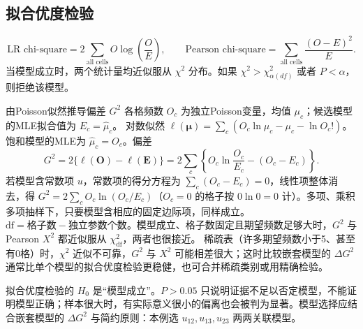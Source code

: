 \subsection{拟合优度检验}
\[
\text{LR chi-square}=2\sum_{\text{all cells}}O\log\left(\frac OE\right),\qquad
\text{Pearson chi-square}=\sum_{\text{all cells}}\frac{(O-E)^2}{E}.
\]
当模型成立时，两个统计量均近似服从 $\chi^2$ 分布。如果 $\chi^2>\chi^2_{\alpha(df)}$ 或者 $P<\alpha$，则拒绝该模型。
\begin{derivation}{由Poisson似然推导偏差 $G^2$}
各格频数 $O_c$ 为独立Poisson变量，均值 $\mu_c$；候选模型的MLE拟合值为 $E_c=\widehat\mu_c$。
对数似然 $\ell(\bm\mu)=\sum_c(O_c\ln\mu_c-\mu_c-\ln O_c!)$。饱和模型的MLE为 $\widehat\mu_c=O_c$。偏差
\[
G^2=2\{\ell(\bm O)-\ell(\bm E)\}=2\sum_c\left\{O_c\ln\frac{O_c}{E_c}-(O_c-E_c)\right\}.
\]
若模型含常数项 $u$，常数项的得分方程为 $\sum_c(O_c-E_c)=0$，线性项整体消去，得 $G^2=2\sum_cO_c\ln(O_c/E_c)$（$O_c=0$ 的格子按 $0\ln0=0$ 计）。多项、乘积多项抽样下，只要模型含相应的固定边际项，同样成立。
$\mathrm{df}=\text{格子数}-\text{独立参数个数}$。模型成立、格子数固定且期望频数足够大时，$G^2$ 与Pearson $X^2$ 都近似服从 $\chi^2_{\mathrm{df}}$，两者也很接近。
稀疏表（许多期望频数小于5、甚至有0格）时，$\chi^2$ 近似不可靠，$G^2$ 与 $X^2$ 可能相差很大；这时比较嵌套模型的 $\Delta G^2$ 通常比单个模型的拟合优度检验更稳健，也可合并稀疏类别或用精确检验。
\end{derivation}
\begin{annotation}拟合优度检验的 $H_0$ 是“模型成立”。$P>0.05$ 只说明证据不足以否定模型，不能证明模型正确；样本很大时，有实际意义很小的偏离也会被判为显著。模型选择应结合嵌套模型的 $\Delta G^2$ 与简约原则：本例选 $u_{12},u_{13},u_{23}$ 两两关联模型。\end{annotation}
